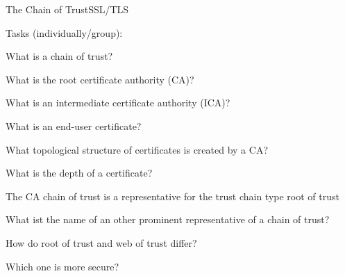 ﻿\begin{frame}{The \alert{Chain of Trust}}{SSL/TLS}
\begin{exampleblock}{Tasks (individually/group):}
    \begin{description}[???]
        \item [???] What is a \alert{chain of trust}?
        \item [???] What is the \alert{root certificate authority (CA)}?
        \item [???] What is an \alert{intermediate certificate authority (ICA)}?
        \item [???] What is an \alert{end-user} certificate?
        \item [???] What \alert{topological structure} of \alert{certificates} is created by a \alert{CA}?
        \item [???] What is the \alert{depth} of a certificate?
        \item [???] The \alert{CA chain of trust} is a representative for the trust chain type \alert{root of trust}
        \begin{description}[???]
            \item [???] What ist the name of an other \alert{prominent representative} of a chain of trust?
            \item [???] How do \alert{root of trust} and \alert{web of trust} differ?
            \item [???] Which one is \alert{more secure}?
        \end{description}
    \end{description}
\end{exampleblock}
\end{frame}
